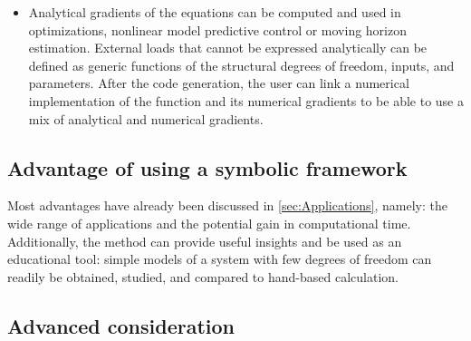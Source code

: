 \documentclass[wes, manuscript]{copernicus}
\begin{document}
\begin{itemize}
\item Analytical gradients of the equations can be computed and used in optimizations,
nonlinear model predictive control or moving horizon estimation. External loads that cannot be expressed analytically can be defined as generic functions of the structural degrees of freedom, inputs, and parameters. After the code generation, the user can link a numerical implementation of the function and its numerical gradients to be able to use a mix of analytical and numerical gradients.
\end{itemize}


\subsection{Advantage of using a symbolic framework}
\label{sec:Advantages}
Most advantages have already been discussed in \autoref{sec:Applications}, namely: the wide range of applications and the potential gain in computational time.
Additionally, the method can provide useful insights and be used as an educational tool: simple models of a system with few degrees of freedom can readily be obtained, studied, and compared to hand-based calculation.


\subsection{Advanced consideration}
\label{sec:AdvancedConsiderations}
\end{document}
